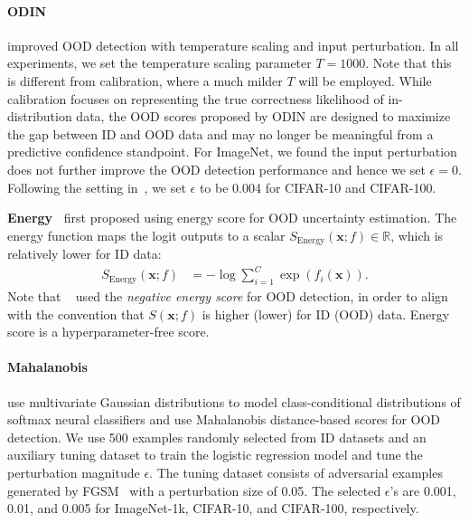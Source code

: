 \documentclass{article}
\def\*#1{\mathbf{#1}}
\begin{document}
\paragraph{ODIN~\cite{liang2018enhancing}} \citeauthor{liang2018enhancing} improved OOD detection with temperature scaling and input perturbation. In all experiments, we set the temperature scaling parameter $T = 1000$. Note that this is different from calibration, where a much milder $T$ will be employed. While calibration focuses on representing the
true correctness likelihood of in-distribution data, the OOD scores proposed by ODIN are designed to maximize the gap between ID and OOD data and may no longer be meaningful from a predictive confidence standpoint.
For ImageNet, we found the input perturbation does not further improve the OOD detection performance and hence we set $\epsilon=0$. 
Following the setting in~\cite{liang2018enhancing}, we set $\epsilon$ to be 0.004 for CIFAR-10 and CIFAR-100.



\textbf{Energy~\cite{liu2020energy}} \citeauthor{liu2020energy} first proposed using energy score for OOD uncertainty estimation. The energy function  maps the logit outputs to a scalar $S_\mathrm{Energy}(\*x; f) \in \mathbb{R}$, which is relatively lower for ID data:
\begin{align}
\label{eq:energy}
S_\mathrm{Energy}(\*x; f)& =-\log \sum_{i=1}^{C}\exp(f_i(\*x)).
\end{align}
Note that \citeauthor{liu2020energy}~\cite{liu2020energy} used the \emph{negative energy score} for OOD detection, in order to align with the convention that $S(\*x;f)$ is higher (lower) for ID (OOD) data. Energy score is a hyperparameter-free score. 

\paragraph{Mahalanobis~\cite{lee2018simple}} \citeauthor{lee2018simple} use multivariate Gaussian distributions to model class-conditional distributions of softmax neural classifiers and use Mahalanobis distance-based scores for OOD detection. We use 500 examples randomly selected from ID datasets and an auxiliary tuning dataset to train the logistic regression model and tune the perturbation magnitude $\epsilon$. The tuning dataset consists of adversarial examples generated by FGSM~\cite{goodfellow2014explaining} with a perturbation size of 0.05.\@
The selected $\epsilon$'s are 0.001, 0.01, and 0.005 for ImageNet-1k, CIFAR-10, and CIFAR-100, respectively.
\end{document}
